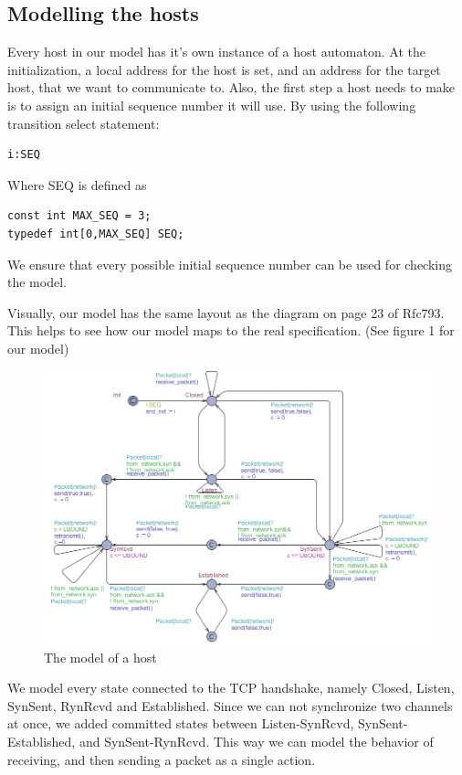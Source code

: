 \documentclass[twocolumn]{article}
\begin{document}
\subsection{Modelling the hosts}
Every host in our model has it's own instance of a host automaton. At the initialization, a local address for the host is set, and an address for the target host, that we want to communicate to. Also, the first step a host needs to make is to assign an initial sequence number it will use.
By using the following transition select statement:
\begin{verbatim}i:SEQ
\end{verbatim}
Where SEQ is defined as 
\begin{verbatim}const int MAX_SEQ = 3;
typedef int[0,MAX_SEQ] SEQ;
\end{verbatim}
We ensure that every possible initial sequence number can be used for checking the model.

Visually, our model has the same layout as the diagram on page 23 of Rfc793. This helps to see how our model maps to the real specification. (See figure 1 for our model)
\begin{figure}
  \includegraphics[scale=0.55]{host_model} %
  \caption{The model of a host}
\end{figure}
We model every state connected to the TCP handshake, namely Closed, Listen, SynSent, RynRcvd and Established. Since we can not synchronize two channels at once, we added committed states between Listen-SynRcvd, SynSent-Established, and SynSent-RynRcvd. This way we can model the behavior of receiving, and then sending a packet as a single action.
\end{document}
